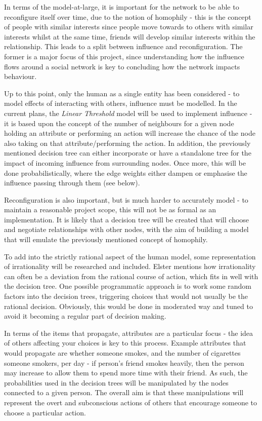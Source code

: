 \documentclass[]{article}
\begin{document}
In terms of the model-at-large, it is important for the network to be able to reconfigure itself over time, due to the notion of homophily \cite{USN} - this is the concept of people with similar interests since people move towards to others with similar interests whilst at the same time, friends will develop similar interests within the relationship. This leads to a split between influence and reconfiguration. The former is a major focus of this project, since understanding how the influence flows around a social network is key to concluding how the network impacts behaviour. 

Up to this point, only the human as a single entity has been considered - to model effects of interacting with others, influence must be modelled. In the current plans, the \emph{Linear Threshold} model will be used to implement influence - it is based upon the concept of the number of neighbours for a given node holding an attribute or performing an action will increase the chance of the node also taking on that attribute/performing the action. In addition, the previously mentioned decision tree can either incorporate or have a standalone tree for the impact of incoming influence from surrounding nodes. Once more, this will be done probabilistically, where the edge weights either dampen or emphasise the influence passing through them (see below). 

Reconfiguration is also important, but is much harder to accurately model - to maintain a reasonable project scope, this will not be as formal as an implementation. It is likely that a decision tree will be created that will choose and negotiate relationships with other nodes, with the aim of building a model that will emulate the previously mentioned concept of homophily.

To add into the strictly rational aspect of the human model, some representation of irrationality will be researched and included. Elster \cite{ESB} mentions how irrationality can often be a deviation from the rational course of action, which fits in well with the decision tree. One possible programmatic approach is to work some random factors into the decision trees, triggering choices that would not usually be the rational decision. Obviously, this would be done in moderated way and tuned to avoid it becoming a regular part of decision making.

In terms of the items that propagate, attributes are a particular focus - the idea of others affecting your choices is key to this process. Example attributes that would propagate are whether someone smokes, and the number of cigarettes someone smokers, per day - if person's friend smokes heavily, then the person may increase to allow them to spend more time with their friend. As such, the probabilities used in the decision trees will be manipulated by the nodes connected to a given person. The overall aim is that these manipulations will represent the overt and subconscious actions of others that encourage someone to choose a particular action.
\end{document}
